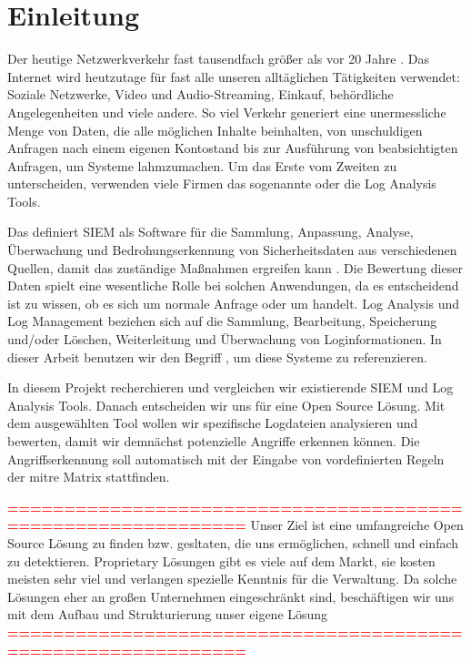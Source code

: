 \section{Einleitung}

Der heutige Netzwerkverkehr fast tausendfach größer als vor 20 Jahre \citep{Roser_I}. Das Internet wird heutzutage für fast alle unseren alltäglichen Tätigkeiten verwendet: Soziale Netzwerke, Video und Audio-Streaming, Einkauf, behördliche Angelegenheiten und viele andere. So viel Verkehr generiert eine unermessliche Menge von Daten, die alle möglichen Inhalte beinhalten, von unschuldigen Anfragen nach einem eigenen Kontostand bis zur Ausführung von beabsichtigten Anfragen, um Systeme lahmzumachen. Um das Erste vom Zweiten zu unterscheiden, verwenden viele Firmen das sogenannte  oder die Log Analysis Tools. 

Das  definiert \gls{SIEM} als Software für die Sammlung, Anpassung, Analyse, Überwachung und Bedrohungserkennung von Sicherheitsdaten aus verschiedenen Quellen, damit das zuständige   Maßnahmen ergreifen kann \citep{NIST_Definitions}. Die Bewertung dieser Daten spielt eine wesentliche Rolle bei solchen Anwendungen, da es entscheidend ist zu wissen, ob es sich um normale Anfrage oder um  handelt. Log Analysis und Log Management beziehen sich auf die Sammlung, Bearbeitung, Speicherung und/oder Löschen, Weiterleitung und Überwachung von Loginformationen. In dieser Arbeit benutzen wir den Begriff , um diese Systeme zu referenzieren.

In diesem Projekt recherchieren und vergleichen wir existierende \gls{SIEM} und Log Analysis Tools. Danach entscheiden wir uns für eine \gls{Open Source} Lösung. Mit dem ausgewählten Tool wollen wir spezifische Logdateien analysieren und bewerten, damit wir demnächst potenzielle Angriffe erkennen können. Die Angriffserkennung soll automatisch mit der Eingabe von vordefinierten Regeln der \gls{mitre} Matrix stattfinden. 

\textcolor{red}{\textbf{=============================================================}}
Unser Ziel ist eine umfangreiche \gls{Open Source} Lösung zu finden bzw. gesltaten, die uns ermöglichen,  schnell und einfach zu detektieren. \gls{Proprietary} Lösungen gibt es viele auf dem Markt, sie kosten meisten sehr viel und verlangen spezielle Kenntnis für die Verwaltung. Da solche Lösungen eher an großen Unternehmen eingeschränkt sind, beschäftigen wir uns mit dem Aufbau und Strukturierung unser eigene Lösung 
\textcolor{red}{\textbf{=============================================================}}

